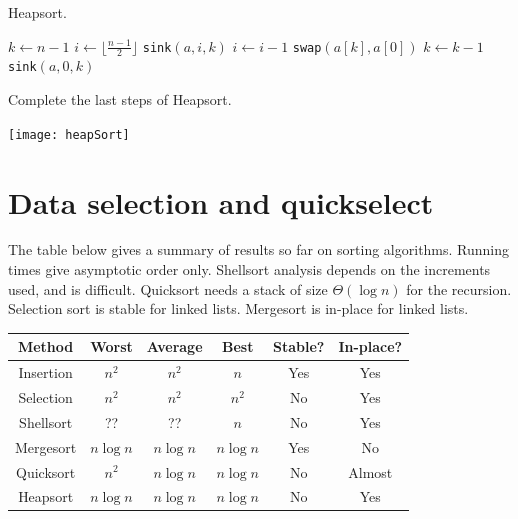 \begin{algorithm}[H]
  \caption{Heapsort.}
  \label{alg:heapsort}
\begin{algorithmic}[1]
\State $k \gets n-1$ 
\State $i \gets \lfloor \frac{n-1}{2} \rfloor $
	\State \texttt{sink}$(a, i, k)$ 
	\State $i\gets i - 1$
\EndWhile {}
	\State \texttt{swap}$(a[k], a[0])$
	\State $k \gets k - 1$
	\State \texttt{sink}$(a, 0, k)$ 
\EndWhile
\State {}
\EndFunction  
\end{algorithmic}
\end{algorithm}

\begin{Boxample}[0] Complete the last steps of Heapsort.
\begin{center}
\texttt{[image: heapSort]}
\end{center}
\end{Boxample}



\chapter{Data selection and quickselect} %
\label{sec:qselect}

The table below gives a summary of results so far on sorting algorithms.
Running times give asymptotic order only. 
Shellsort analysis depends on the increments used, and is difficult. 
Quicksort needs a stack of size $\Theta(\log n)$ for the recursion. 
Selection sort is stable for linked lists. 
Mergesort is in-place for linked lists.

\begin{center}
\begin{tabular}{|c|c|c|c|c|c|} \hline 
Method & Worst & Average & Best & Stable? & In-place? \\
\hline
Insertion & $n^2$ & $n^2$ & $n$ & Yes & Yes \\
Selection & $n^2$ & $n^2$ & $n^2$ & No & Yes \\
Shellsort & ?? & ?? & $n$ & No & Yes \\
Mergesort & $n \log n$ & $n \log n$ & $n \log n$ & Yes & No \\
Quicksort & $n^2$ & $n \log n$ & $n \log n$ & No & Almost \\
Heapsort & $n \log n$ & $n \log n$ & $n \log n$ & No & Yes \\
\hline
\end{tabular}
\end{center}


